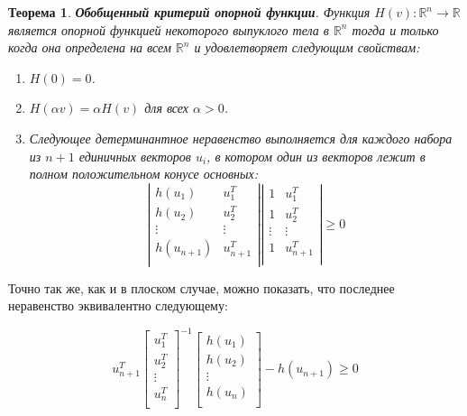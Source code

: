 \documentclass[a4paper, 12pt, titlepage]{article}
\theoremstyle{definition}
\theoremstyle{plain}
\newtheorem{SmartTheorem}{Теорема}
\theoremstyle{plain}
\begin{document}
\begin{SmartTheorem}
 \label{thm:support-function-criterio-ext}
 \textbf{Обобщенный критерий опорной функции}.
 Функция $H(v): \mathbb{R}^{n} \to \mathbb{R}$ является опорной функцией
 некоторого выпуклого тела в $\mathbb{R}^{n}$ тогда и только когда она
 определена на всем $\mathbb{R}^{n}$ и удовлетворяет следующим свойствам:
 \begin{enumerate}
  \item $H(0) = 0$.
  \item $H(\alpha v) = \alpha H(v)$ для всех $\alpha > 0$.
  \item Следующее детерминантное неравенство выполняется для каждого набора из
  $n + 1$ единичных векторов $u_{i}$, в котором один из векторов лежит в полном
  положительном конусе основных:
\begin{equation}
\label{thm:support-function-criterio-ext:condition}
 \left|\begin{array}{cc}
  h(u_{1}) & u_{1}^{T} \\
  h(u_{2}) & u_{2}^{T} \\
  \vdots & \vdots \\
  h(u_{n + 1}) & u_{n + 1}^{T} \\
 \end{array}\right|
  \left|\begin{array}{cc}
  1 & u_{1}^{T} \\
  1 & u_{2}^{T} \\
  \vdots & \vdots \\
  1 & u_{n + 1}^{T} \\
 \end{array}\right|
 \geq 0
\end{equation}

 \end{enumerate}
\end{SmartTheorem}

Точно так же, как и в плоском случае, можно показать, что последнее неравенство
эквивалентно следующему:

\begin{equation}
\label{thm:support-function-criterio-ext:condition2}
 u_{n + 1}^{T}
 \left[
 \begin{array}{c}
 u_{1}^{T} \\
 u_{2}^{T} \\
 \vdots \\
 u_{n}^{T} \\
 \end{array}
 \right]^{-1}
 \left[
 \begin{array}{c}
 h(u_{1}) \\
 h(u_{2}) \\
 \vdots \\
 h(u_{n}) \\
 \end{array}
 \right] - h(u_{n + 1}) \geq 0
\end{equation}
\end{document}
